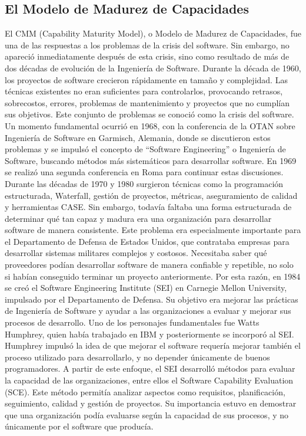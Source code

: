 \documentclass{./plantilla/umss}
\begin{document}
\subsection{El Modelo de Madurez de Capacidades}

El CMM (Capability Maturity Model), o Modelo de Madurez de Capacidades, fue una de las respuestas a los problemas de la crisis del software. Sin embargo, no apareció inmediatamente después de esta crisis, sino como resultado de más de dos décadas de evolución de la Ingeniería de Software.
Durante la década de 1960, los proyectos de software crecieron rápidamente en tamaño y complejidad. Las técnicas existentes no eran suficientes para controlarlos, provocando retrasos, sobrecostos, errores, problemas de mantenimiento y proyectos que no cumplían sus objetivos. Este conjunto de problemas se conoció como la crisis del software.
Un momento fundamental ocurrió en 1968, con la conferencia de la OTAN sobre Ingeniería de Software en Garmisch, Alemania, donde se discutieron estos problemas y se impulsó el concepto de “Software Engineering” o Ingeniería de Software, buscando métodos más sistemáticos para desarrollar software. En 1969 se realizó una segunda conferencia en Roma para continuar estas discusiones.
Durante las décadas de 1970 y 1980 surgieron técnicas como la programación estructurada, Waterfall, gestión de proyectos, métricas, aseguramiento de calidad y herramientas CASE. Sin embargo, todavía faltaba una forma estructurada de determinar qué tan capaz y madura era una organización para desarrollar software de manera consistente.
Este problema era especialmente importante para el Departamento de Defensa de Estados Unidos, que contrataba empresas para desarrollar sistemas militares complejos y costosos. Necesitaba saber qué proveedores podían desarrollar software de manera confiable y repetible, no solo si habían conseguido terminar un proyecto anteriormente.
Por esta razón, en 1984 se creó el Software Engineering Institute (SEI) en Carnegie Mellon University, impulsado por el Departamento de Defensa. Su objetivo era mejorar las prácticas de Ingeniería de Software y ayudar a las organizaciones a evaluar y mejorar sus procesos de desarrollo.
Uno de los personajes fundamentales fue Watts Humphrey, quien había trabajado en IBM y posteriormente se incorporó al SEI. Humphrey impulsó la idea de que mejorar el software requería mejorar también el proceso utilizado para desarrollarlo, y no depender únicamente de buenos programadores.
A partir de este enfoque, el SEI desarrolló métodos para evaluar la capacidad de las organizaciones, entre ellos el Software Capability Evaluation (SCE). Este método permitía analizar aspectos como requisitos, planificación, seguimiento, calidad y gestión de proyectos. Su importancia estuvo en demostrar que una organización podía evaluarse según la capacidad de sus procesos, y no únicamente por el software que producía.
\end{document}
